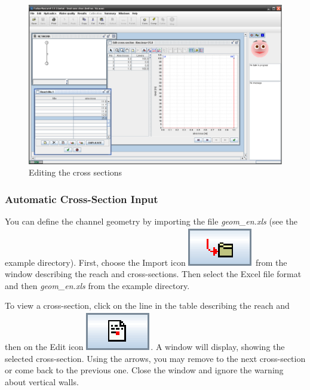 \documentclass[a4paper,12pt]{article}
\begin{document}
\newpage

\begin{figure}[h]
  \begin{center}
  \includegraphics[scale=0.32]{cross_sections}
  \caption{Editing the cross sections}
  \end{center}
\end{figure}

\subsubsection{Automatic Cross-Section Input}

\hspace{0.5cm} You can define the channel geometry by importing the file \textit{geom\_en.xls} (see the example directory). First, choose
the Import icon \includegraphics[scale=0.6]{import} from the window describing the reach and cross-sections. Then select the Excel file format and then \textit{geom\_en.xls} from the example
directory.

\vspace{0.5cm}

To view a cross-section, click on the line in the table describing the reach and then on the Edit icon
\includegraphics[scale=0.6]{edit}. A window will display, showing the selected cross-section. Using the
arrows, you may remove to the next cross-section or come back to the previous one. Close the window and ignore the warning about vertical walls.
\end{document}
